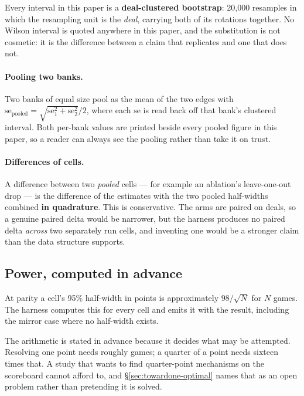 Every interval in this paper is a \textbf{deal-clustered bootstrap}: 20{,}000 resamples in which the
resampling unit is the \emph{deal}, carrying both of its rotations together. No Wilson interval is
quoted anywhere in this paper, and the substitution is not cosmetic: it is the difference between a
claim that replicates and one that does not.

\paragraph{Pooling two banks.} Two banks of equal size pool as the mean of the two edges with
$\text{se}_{\text{pooled}} = \sqrt{\text{se}_1^2 + \text{se}_2^2}/2$, where each $\text{se}$ is read
back off that bank's clustered interval. Both per-bank values are printed beside every pooled figure
in this paper, so a reader can always see the pooling rather than take it on trust.

\paragraph{Differences of cells.} A difference between two \emph{pooled} cells --- for example an
ablation's leave-one-out drop --- is the difference of the estimates with the two pooled half-widths
combined \textbf{in quadrature}. This is conservative. The arms are paired on deals, so a genuine
paired delta would be narrower, but the harness produces no paired delta \emph{across} two separately
run cells, and inventing one would be a stronger claim than the data structure supports.

\subsection{Power, computed in advance}
\label{sec:methodology-power}

At parity a cell's 95\% half-width in points is approximately $98/\sqrt{N}$ for $N$ games. The
harness computes this for every cell and emits it with the result, including the mirror case where
no half-width exists.

The arithmetic is stated in advance because it decides what may be attempted. Resolving one point
needs roughly \vsevenScoreboardGames{} games; a quarter of a point needs sixteen times that. A study
that wants to find quarter-point mechanisms on the scoreboard cannot afford to, and
\S\ref{sec:towardone-optimal} names that as an open problem rather than pretending it is solved.

